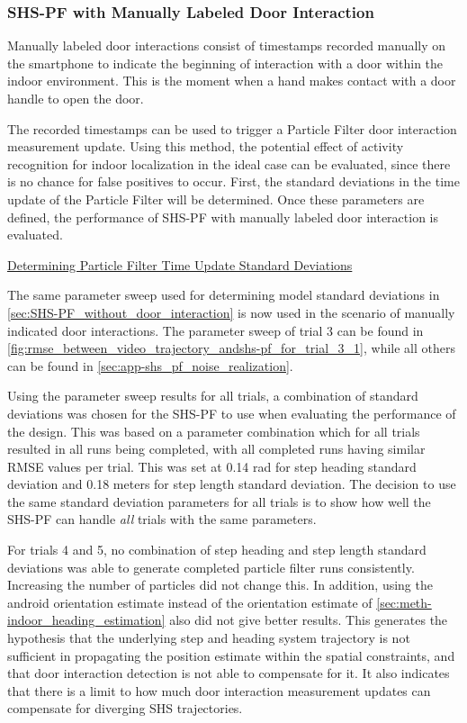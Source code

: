 \subsubsection{SHS-PF with Manually Labeled Door Interaction}
\label{sec:results-SHS_PF_manually indicated}

Manually labeled door interactions consist of timestamps recorded manually on the smartphone to indicate the beginning of interaction with a door within the indoor environment. This is the moment when a hand makes contact with a door handle to open the door. \par 

The recorded timestamps can be used to trigger a Particle Filter door interaction measurement update. Using this method, the potential effect of activity recognition for indoor localization in the ideal case can be evaluated, since there is no chance for false positives to occur.
First, the standard deviations in the time update of the Particle Filter will be determined. Once these parameters are defined, the performance of SHS-PF with manually labeled door interaction is evaluated.

\underline{Determining Particle Filter Time Update Standard Deviations}

The same parameter sweep used for determining model standard deviations in \cref{sec:SHS-PF_without_door_interaction} is now used in the scenario of manually indicated door interactions. The parameter sweep of trial 3 can be found in \cref{fig:rmse_between_video_trajectory_andshs-pf_for_trial_3_1}, while all others can be found in \cref{sec:app-shs_pf_noise_realization}. \par
 
Using the parameter sweep results for all trials, a combination of standard deviations was chosen for the SHS-PF to use when evaluating the performance of the design. This was based on a parameter combination which for all trials resulted in all runs being completed, with all completed runs having similar RMSE values per trial. This was set at 0.14 rad for step heading standard deviation and 0.18 meters for step length standard deviation. The decision to use the same standard deviation parameters for all trials is to show how well the SHS-PF can handle \textit{all} trials with the same parameters.  \par 

For trials 4 and 5, no combination of step heading and step length standard deviations was able to generate completed particle filter runs consistently. Increasing the number of particles did not change this. In addition, using the android orientation estimate instead of the orientation estimate of \cref{sec:meth-indoor_heading_estimation} also did not give better results. This generates the hypothesis that the underlying step and heading system trajectory is not sufficient in propagating the position estimate within the spatial constraints, and that door interaction detection is not able to compensate for it. It also indicates that there is a limit to how much door interaction measurement updates can compensate for diverging SHS trajectories.  \par

